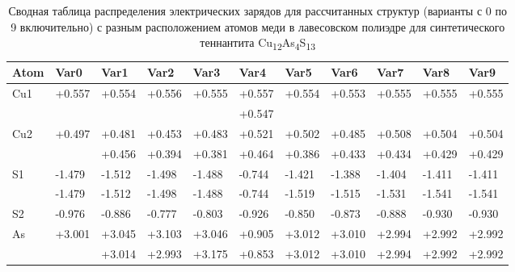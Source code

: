 \begin{landscape}
\begin{table} [htbp]
\centering

\caption{Сводная таблица распределения электрических зарядов для рассчитанных структур (варианты с 0 по 9 включительно) с разным расположением атомов меди в лавесовском полиэдре для синтетического теннантита Cu\textsubscript{12}As\textsubscript{4}S\textsubscript{13}}%
	\label{mod_char1}%
    \renewcommand{\arraystretch}{1.5}
    \begin{tabular}{@{}@{\extracolsep{10pt}}lllllllllll@{}} 
      \toprule     %
Atom & Var0          & Var1          & Var2          & Var3          & Var4   & Var5          & Var6          & Var7          & Var8          & Var9              \\  \midrule  
\multirow{2}{*}{Cu1} & \multirow{2}{*}{+0.557}  &\multirow{2}{*}{+0.554}& \multirow{2}{*}{+0.556} & \multirow{2}{*}{+0.555} & +0.557 & \multirow{2}{*}{+0.554}  & \multirow{2}{*}{+0.553}  & \multirow{2}{*}{+0.555}  & \multirow{2}{*}{+0.555}& \multirow{2}{*}{+0.555} \\
&&&&&+0.547&&&&&\\ \hline
\multirow{2}{*}{Cu2} & \multirow{2}{*}{+0.497}  & +0.481 & +0.453  & +0.483 & +0.521 & +0.502 & +0.485  & +0.508  & +0.504  & +0.504    \\ 
				                             & &  +0.456 &  +0.394 &+0.381 &  +0.464 & +0.386 &+0.433 & +0.434 &+0.429 & +0.429  \\ \hline
\multirow{2}{*}{S1}   & -1.479 & -1.512 & -1.498 &-1.488 & -0.744 &  -1.421 & -1.388  & -1.404  & -1.411 & -1.411    \\ 
                              &-1.479 & -1.512 &-1.498 & -1.488 & -0.744  & -1.519 & -1.515 & -1.531 & -1.541 &  -1.541   \\ \hline
S2   & -0.976        & -0.886        & -0.777        & -0.803        & -0.926   & -0.850        & -0.873        & -0.888        & -0.930        & -0.930          \\ \hline
\multirow{2}{*}{As}   & \multirow{2}{*}{+3.001} & +3.045  & +3.103  & +3.046  & +0.905&  +3.012 &  +3.010 & +2.994 & +2.992 &  +2.992     \\ 
&  & +3.014 & +2.993 &+3.175 & +0.853&+3.012 & +3.010 &  +2.994 &+2.992 & +2.992 \\ \hline
\bottomrule 

\end{tabular}
\end{table}
\end{landscape}

